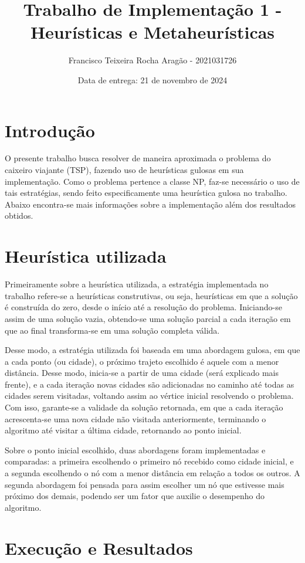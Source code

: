 \documentclass[10pt]{extarticle} %
\title{Trabalho de Implementação 1 - Heurísticas e Metaheurísticas}
\author{Francisco Teixeira Rocha Aragão - 2021031726}
\date{Data de entrega: 21 de novembro de 2024}
\begin{document}
\maketitle

\section{Introdução}

O presente trabalho busca resolver de maneira aproximada o problema do caixeiro viajante (TSP), fazendo uso de heurísticas gulosas em sua implementação. Como o problema pertence a classe NP, faz-se necessário o uso de tais estratégias, sendo feito especificamente uma heurística gulosa no trabalho. Abaixo encontra-se mais informações sobre a implementação além dos resultados obtidos.

\section{Heurística utilizada}

Primeiramente sobre a heurística utilizada, a estratégia implementada no trabalho refere-se a heurísticas construtivas, ou seja, heurísticas em que a solução é construída do zero, desde o início até a resolução do problema. Iniciando-se assim de uma solução vazia, obtendo-se uma solução parcial a cada iteração em que ao final transforma-se em uma solução completa válida.

Desse modo, a estratégia utilizada foi baseada em uma abordagem gulosa, em que a cada ponto (ou cidade), o próximo trajeto escolhido é aquele com a menor distância. Desse modo, inicia-se a partir de uma cidade (será explicado mais frente), e a cada iteração novas cidades são adicionadas no caminho até todas as cidades serem visitadas, voltando assim ao vértice inicial resolvendo o problema. Com isso, garante-se a validade da solução retornada, em que a cada iteração acrescenta-se uma nova cidade não visitada anteriormente, terminando o algoritmo até visitar a última cidade, retornando ao ponto inicial.

Sobre o ponto inicial escolhido, duas abordagens foram implementadas e comparadas: a primeira escolhendo o primeiro nó recebido como cidade inicial, e a segunda escolhendo o nó com a menor distância em relação a todos os outros. A segunda abordagem foi pensada para assim escolher um nó que estivesse mais próximo dos demais, podendo ser um fator que auxilie o desempenho do algoritmo. 

\section{Execução e Resultados}
\end{document}
